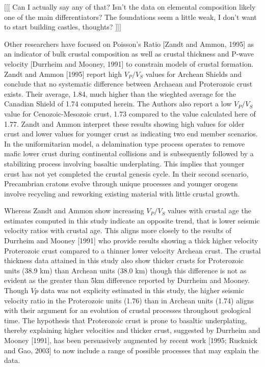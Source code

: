 \documentclass[draft, 12pt]{article}
\begin{document}
[[[ Can I actually say any of that? Isn't the data on elemental composition likely one of the main differentiators? The foundations seem a little weak, I don't want to start building castles, thoughts? ]]]

Other researchers have focused on Poisson's Ratio [Zandt and Ammon, 1995] as an indicator of bulk crustal composition as well as crustal thickness and P-wave velocity [Durrheim and Mooney, 1991] to constrain models of crustal formation. Zandt and Ammon [1995] report high $V_P/V_S$ values for Archean Shields and conclude that no systematic difference between Archaean and Proterozoic crust exists. Their average, 1.84, much higher than the wieghted average for the Canadian Shield of 1.74 computed herein. The Authors also report a low $V_P/V_S$ value for Cenozoic-Mesozoic crust, 1.73 compared to the value calculated here of 1.77. Zandt and Ammon interpret these results showing high values for older crust and lower values for younger crust as indicating two end member scenarios. In the uniformitarian model, a delamination type process operates to remove mafic lower crust during continental collisions and is subsequently followed by a stabilizing process involving basaltic underplating. This implies that younger crust has not yet completed the crustal genesis cycle. In their second scenario, Precambrian cratons evolve through unique processes and younger orogens involve recycling and reworking existing material with little crustal growth.

Whereas Zandt and Ammon show increasing $V_P/V_S$ values with crustal age the estimates computed in this study indicate an opposite trend, that is lower seismic velocity ratios with crustal age. This aligns more closely to the results of Durrheim and Mooney [1991] who provide results showing a thick higher velocity Proterozoic crust compared to a thinner lower velocity Archean crust. The crustal thickness data attained in this study also show thicker crusts for Proterozoic units (38.9 km) than Archean units (38.0 km) though this difference is not as evident as the greater than 5km difference reported by Durrheim and Mooney. Though $Vp$ data was not explicity estimated in this study, the higher seismic velocity ratio in the Proterozoic units (1.76) than in Archean units (1.74) aligns with their argument for an evolution of crustal processes throughout geological time. The hypothesis that Proterozoic crust is prone to basaltic underplating, thereby explaining higher velocities and thicker crust, suggested by Durrheim and Mooney [1991], has been persuasively augmented by recent work [1995; Rucknick and Gao, 2003] to now include a range of possible processes that may explain the data.
\end{document}
